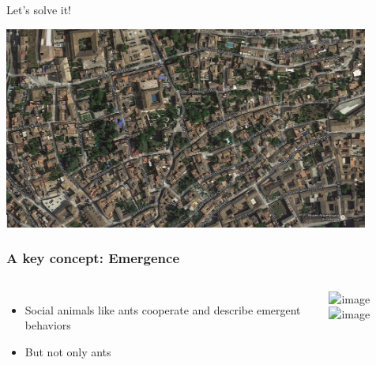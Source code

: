 \begin{frame}{Let's solve it!}

\begin{center} 
   \includegraphics[width=0.9\textwidth]{images/albayzin.png} 
\end{center} 


\end{frame}


\begin{frame}
\frametitle{A key concept: Emergence}
\begin{columns}
 \begin{itemize}
  \item Social animals like ants cooperate and describe emergent behaviors
  \item<2-> But not only ants
 \end{itemize}
\includegraphics<1>[width=4cm]{images/al-Khwarizmi.png}
\includegraphics<2->[width=4cm]{images/al-Khwarizmi.png}
\end{columns}

\end{frame}
